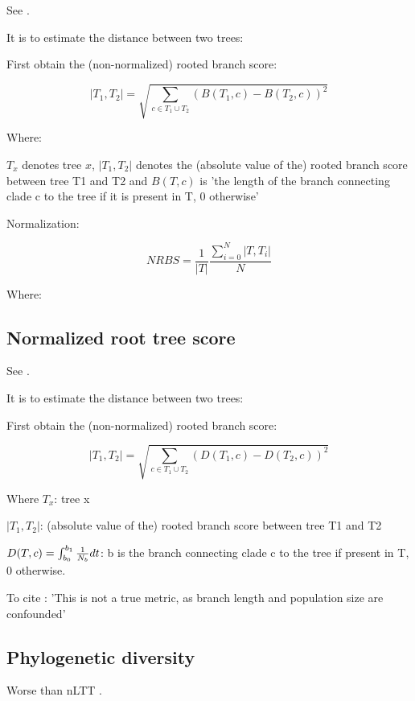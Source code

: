 
See \cite{heled2010bayesian}.

It is to estimate the distance between two trees:

First obtain the (non-normalized) rooted branch score:

\begin{equation}
  \left|T_{1},T_{2}\right|=\sqrt{\sum_{c\in T_{1}\cup T_{2}}\left(B\left(T_{1},c\right)-B\left(T_{2},c\right)\right)^{2}}
  \label{eq:root_branch_score}
\end{equation}

Where:

$T_{x}$ denotes tree $x$, 
$\left|T_{1},T_{2}\right|$ denotes the (absolute value of the) rooted branch score between tree T1 and T2
and $B(T,c)$ is 'the length of the branch connecting clade c to the tree if it is present in T, 0 otherwise'

Normalization:

\begin{equation}
  NRBS = \frac{1}{\left|T\right|}\frac{\sum_{i=0}^{N}\left|T,T_{i}\right|}{N}
  \label{eq:normalized_root_branch_score}
\end{equation}

Where:


\subsection{Normalized root tree score}


See \cite{heled2010bayesian}.

It is to estimate the distance between two trees:

First obtain the (non-normalized) rooted branch score:

\begin{equation}
  \left|T_{1},T_{2}\right|=\sqrt{\sum_{c\in T_{1}\cup T_{2}}\left(D\left(T_{1},c\right)-D\left(T_{2},c\right)\right)^{2}}
  \label{eq:root_branch_score_huh_again}
\end{equation}

Where $T_{x}$: tree x

$\left|T_{1},T_{2}\right|$: (absolute value of the) rooted branch score between tree T1 and T2


$D(T,c)=\intop_{b_{0}}^{b_{1}}\frac{1}{N_{b}}dt$: b is the branch connecting clade c to the tree if present in T, 0 otherwise.

To cite \cite{heled2010bayesian}: 'This is not a true metric, as branch length and population size are confounded' 

\subsection{Phylogenetic diversity}

Worse than nLTT \cite{janzen2015approximate}.


